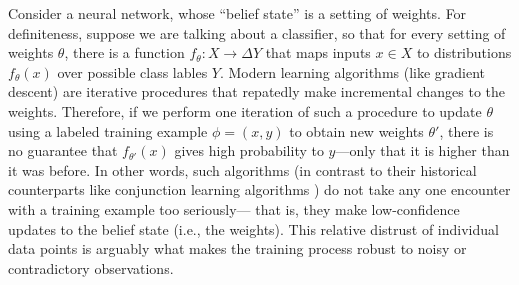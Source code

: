 \begin{example}\label{ex:classifier}
Consider a neural network, whose ``belief state'' is a setting of weights.
For definiteness, suppose we are talking about a classifier, so that for every setting of weights $\theta$, there is a function
$f_\theta : X \to \Delta Y$ that maps inputs $x \in X$ to distributions $f_\theta(x)$ over possible class lables $Y$. 
Modern learning algorithms (like gradient descent) 
are iterative procedures that 
repatedly make incremental changes to the weights.
Therefore, if we perform one iteration of such a procedure to update $\theta$ using a labeled training example $\phi = (x,y)$ to obtain new weights $\theta'$, there is no guarantee that $f_{\theta'}(x)$ gives high probability to $y$---only that it is higher than it was before.
In other words, such algorithms 
(in contrast to their historical counterparts like conjunction learning algorithms \parencite{conjunctions}) 
do not take any one encounter with a training example too seriously---
\unskip that is, they make low-confidence updates to the belief state (i.e., the weights). 
This relative distrust of 
individual data points
is arguably what makes the training process robust to noisy or contradictory observations.


\end{example}
